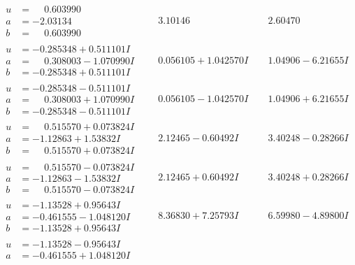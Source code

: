 \documentclass[1p]{elsarticle_modified}
\theoremstyle{definition}
\begin{document}
$$\begin{array}{c|c|c}
\begin{aligned}
u &= \phantom{-}0.603990\phantom{ +0.000000I} \\
a &= -2.03134\phantom{ +0.000000I} \\
b &= \phantom{-}0.603990\phantom{ +0.000000I}\end{aligned}
 & \phantom{-}3.10146\phantom{ +0.000000I} & \phantom{-}2.60470\phantom{ +0.000000I} \\ \hline\begin{aligned}
u &= -0.285348 + 0.511101 I \\
a &= \phantom{-}0.308003 - 1.070990 I \\
b &= -0.285348 + 0.511101 I\end{aligned}
 & \phantom{-}0.056105 + 1.042570 I & \phantom{-}1.04906 - 6.21655 I \\ \hline\begin{aligned}
u &= -0.285348 - 0.511101 I \\
a &= \phantom{-}0.308003 + 1.070990 I \\
b &= -0.285348 - 0.511101 I\end{aligned}
 & \phantom{-}0.056105 - 1.042570 I & \phantom{-}1.04906 + 6.21655 I \\ \hline\begin{aligned}
u &= \phantom{-}0.515570 + 0.073824 I \\
a &= -1.12863 + 1.53832 I \\
b &= \phantom{-}0.515570 + 0.073824 I\end{aligned}
 & \phantom{-}2.12465 - 0.60492 I & \phantom{-}3.40248 - 0.28266 I \\ \hline\begin{aligned}
u &= \phantom{-}0.515570 - 0.073824 I \\
a &= -1.12863 - 1.53832 I \\
b &= \phantom{-}0.515570 - 0.073824 I\end{aligned}
 & \phantom{-}2.12465 + 0.60492 I & \phantom{-}3.40248 + 0.28266 I \\ \hline\begin{aligned}
u &= -1.13528 + 0.95643 I \\
a &= -0.461555 - 1.048120 I \\
b &= -1.13528 + 0.95643 I\end{aligned}
 & \phantom{-}8.36830 + 7.25793 I & \phantom{-}6.59980 - 4.89800 I \\ \hline\begin{aligned}
u &= -1.13528 - 0.95643 I \\
a &= -0.461555 + 1.048120 I \\

\end{aligned}
\end{array}$$
\end{document}
